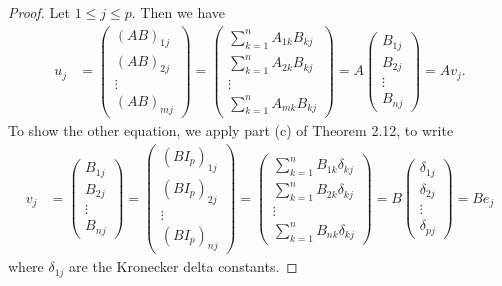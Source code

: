 \begin{proof}
Let \( 1 \leq j \leq p  \). Then we have
\begin{align*}
    {u}_{j} &= \begin{pmatrix}
        {(AB)}_{1j } \\
        {(AB)}_{2j } \\
        \vdots \\
        {(AB)}_{mj} 
    \end{pmatrix} = \begin{pmatrix}
        \sum_{ k=1 }^{ n } {A}_{1k} {B}_{kj} \\
        \sum_{ k=1  }^{  n } {A}_{2k } {B}_{kj } \\
        \vdots \\
        \sum_{ k=1 }^{ n } {A}_{mk } {B}_{kj }
    \end{pmatrix} =  A \begin{pmatrix}
        {B}_{1j } \\
        {B}_{2j } \\
        \vdots \\
        {B}_{nj}
    \end{pmatrix} =  A {v}_{j }.
\end{align*}
To show the other equation, we apply part (c) of Theorem 2.12, to write
\begin{align*}
   {v}_{j}  &= \begin{pmatrix}
       {B}_{1j } \\
       {B}_{2j } \\
       \vdots \\
       {B}_{nj } 
   \end{pmatrix} = 
   \begin{pmatrix}
        (B {I}_{p})_{1j} \\  
        {(B{I}_{p})}_{2j} \\
        \vdots \\
        {(B {I}_{p})}_{nj}
   \end{pmatrix} = \begin{pmatrix}
       \sum_{ k=1  }^{ n } {B}_{1k} {\delta}_{kj} \\
       \sum_{ k=1  }^{ n } {B}_{2k} {\delta}_{kj } \\
       \vdots \\
       \sum_{ k=1  }^{ n } {B}_{nk} {\delta}_{kj } 
       \end{pmatrix} = B \begin{pmatrix}
       {\delta}_{1j } \\
       {\delta}_{2j } \\
       \vdots \\
       {\delta}_{pj } 
   \end{pmatrix} = B {e}_{j}
\end{align*}
where \( {\delta}_{1j} \) are the Kronecker delta constants.
\end{proof}

